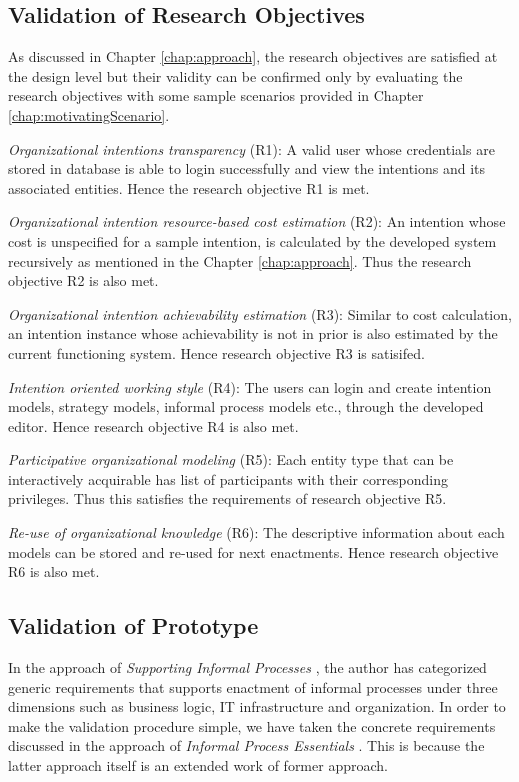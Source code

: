 \subsection{Validation of Research Objectives}
\label{subsec:validationofrequirements}
As discussed in Chapter \ref{chap:approach}, the research objectives are satisfied at the design level but their validity can be confirmed only by evaluating the research objectives with some sample scenarios provided in Chapter \ref{chap:motivatingScenario}.   

\textit{Organizational intentions transparency} (R1): A valid user whose credentials are stored in database is able to login successfully and view the intentions and its associated entities. Hence the research objective R1 is met.

\textit{Organizational intention resource-based cost estimation} (R2): An intention whose cost is unspecified for a sample intention, is calculated by the developed system recursively as mentioned in the Chapter \ref{chap:approach}. Thus the research objective R2 is also met.

\textit{Organizational intention achievability estimation} (R3): Similar to cost calculation, an intention instance whose achievability is not in prior is also estimated by the current functioning system. Hence research objective R3 is satisifed.

\textit{Intention oriented working style} (R4): The users can login and create intention models, strategy models, informal process models etc., through the developed editor. Hence research objective R4 is also met.

\textit{Participative organizational modeling} (R5): Each entity type that can be interactively acquirable has list of participants with their corresponding privileges. Thus this satisfies the requirements of research objective R5.

\textit{Re-use of organizational knowledge} (R6): The descriptive information about each models can be stored and re-used for next enactments. Hence research objective R6 is also met.
	
\subsection{Validation of Prototype}
\label{subsec:validationofprototype}
In the approach of \textit{Supporting Informal Processes} \cite{Sungur2014}, the author has categorized generic requirements that supports enactment of informal processes under three dimensions such as business logic, IT infrastructure and organization. In order to make the validation procedure simple, we have taken the concrete requirements discussed in the approach of \textit{Informal Process Essentials} \cite{Sungur2014a}. This is because the latter approach itself is an extended work of former approach.  

